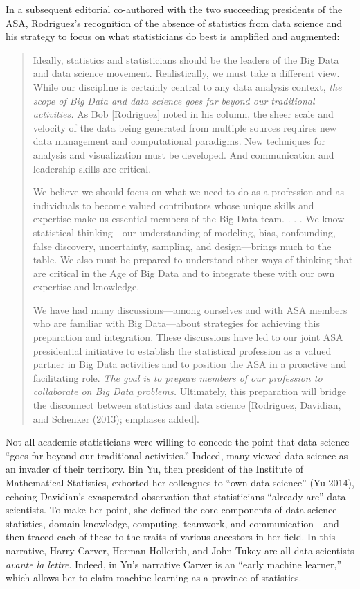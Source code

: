 \documentclass[
  letterpaper,
]{report}
\begin{document}
In a subsequent editorial co-authored with the two succeeding presidents
of the ASA, Rodriguez's recognition of the absence of statistics from
data science and his strategy to focus on what statisticians do best is
amplified and augmented:

\begin{quote}
Ideally, statistics and statisticians should be the leaders of the Big
Data and data science movement. Realistically, we must take a different
view. While our discipline is certainly central to any data analysis
context, \emph{the scope of Big Data and data science goes far beyond
our traditional activities.} As Bob {[}Rodriguez{]} noted in his column,
the sheer scale and velocity of the data being generated from multiple
sources requires new data management and computational paradigms. New
techniques for analysis and visualization must be developed. And
communication and leadership skills are critical.

We believe we should focus on what we need to do as a profession and as
individuals to become valued contributors whose unique skills and
expertise make us essential members of the Big Data team. . . . We know
statistical thinking---our understanding of modeling, bias, confounding,
false discovery, uncertainty, sampling, and design---brings much to the
table. We also must be prepared to understand other ways of thinking
that are critical in the Age of Big Data and to integrate these with our
own expertise and knowledge.

We have had many discussions---among ourselves and with ASA members who
are familiar with Big Data---about strategies for achieving this
preparation and integration. These discussions have led to our joint ASA
presidential initiative to establish the statistical profession as a
valued partner in Big Data activities and to position the ASA in a
proactive and facilitating role. \emph{The goal is to prepare members of
our profession to collaborate on Big Data problems.} Ultimately, this
preparation will bridge the disconnect between statistics and data
science {[}Rodriguez, Davidian, and Schenker (2013); emphases added{]}.
\end{quote}

Not all academic statisticians were willing to concede the point that
data science ``goes far beyond our traditional activities.'' Indeed,
many viewed data science as an invader of their territory. Bin Yu, then
president of the Institute of Mathematical Statistics, exhorted her
colleagues to ``own data science'' (Yu 2014), echoing Davidian's
exasperated observation that statisticians ``already are'' data
scientists. To make her point, she defined the core components of data
science---statistics, domain knowledge, computing, teamwork, and
communication---and then traced each of these to the traits of various
ancestors in her field. In this narrative, Harry Carver, Herman
Hollerith, and John Tukey are all data scientists \emph{avante la
lettre}. Indeed, in Yu's narrative Carver is an ``early machine
learner,'' which allows her to claim machine learning as a province of
statistics.
\end{document}
